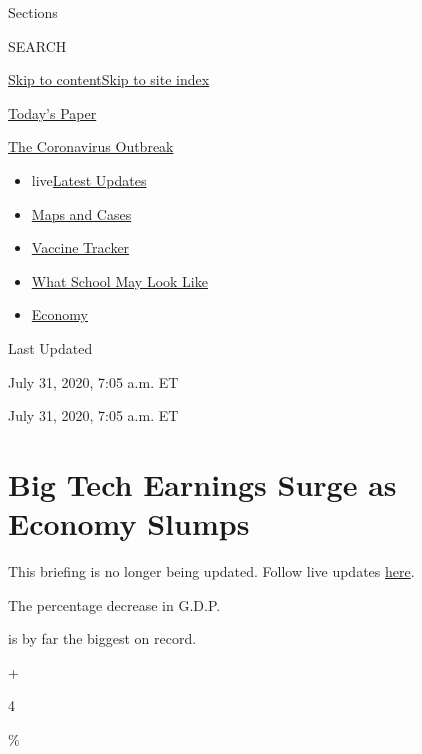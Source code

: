 Sections

SEARCH

\protect\hyperlink{site-content}{Skip to
content}\protect\hyperlink{site-index}{Skip to site index}

\href{https://myaccount.nytimes3xbfgragh.onion/auth/login?response_type=cookie\&client_id=vi}{}

\href{https://www.nytimes3xbfgragh.onion/section/todayspaper}{Today's
Paper}

\href{https://www.nytimes3xbfgragh.onion/news-event/coronavirus}{The
Coronavirus Outbreak}

\begin{itemize}
\tightlist
\item
  live\href{https://www.nytimes3xbfgragh.onion/2020/08/01/world/coronavirus-covid-19.html}{Latest
  Updates}
\item
  \href{https://www.nytimes3xbfgragh.onion/interactive/2020/us/coronavirus-us-cases.html}{Maps
  and Cases}
\item
  \href{https://www.nytimes3xbfgragh.onion/interactive/2020/science/coronavirus-vaccine-tracker.html}{Vaccine
  Tracker}
\item
  \href{https://www.nytimes3xbfgragh.onion/interactive/2020/07/29/us/schools-reopening-coronavirus.html}{What
  School May Look Like}
\item
  \href{https://www.nytimes3xbfgragh.onion/live/2020/07/31/business/stock-market-today-coronavirus}{Economy}
\end{itemize}

Last Updated

July 31, 2020, 7:05 a.m. ET

July 31, 2020, 7:05 a.m. ET

\hypertarget{big-tech-earnings-surge-as-economy-slumps}{%
\section{Big Tech Earnings Surge as Economy
Slumps}\label{big-tech-earnings-surge-as-economy-slumps}}

This briefing is no longer being updated. Follow live updates
\href{https://www.nytimes3xbfgragh.onion/live/2020/07/31/business/stock-market-today-coronavirus}{here}.

The percentage decrease in G.D.P.

is by far the biggest on record.

+

4

\%

